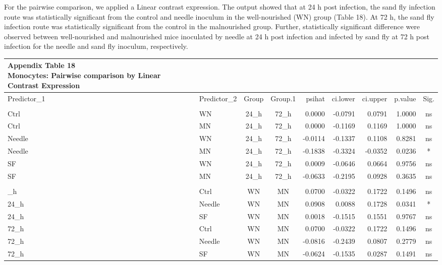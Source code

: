 \documentclass[
  12pt,
  letterpaper,
]{article}
\begin{document}
For the pairwise comparison, we applied a Linear contrast expression. The output showed that at 24 h post infection, the sand fly infection route was statistically significant from the control and needle inoculum in the well-nourished (WN) group (Table 18). At 72 h, the sand fly infection route was statistically significant from the control in the malnourished group. Further, statistically significant difference were observed between well-nourished and malnourished mice inoculated by needle at 24 h post infection and infected by sand fly at 72 h post infection for the needle and sand fly inoculum, respectively.

\begin{longtable}{llccrrrrc}
\caption*{
{\large \textbf{Appendix Table 18}} \\ 
{\small \textbf{Monocytes: Pairwise comparison by Linear Contrast Expression}}
} \\ 
\toprule
Predictor\_1 & Predictor\_2 & Group & Group.1 & psihat & ci.lower & ci.upper & p.value & Sig. \\ 
\midrule\addlinespace[2.5pt]
\multicolumn{9}{l}{Predictor: Time\_point} \\ 
\midrule\addlinespace[2.5pt]
Ctrl & WN & 24\_h & 72\_h & 0.0000 & -0.0791 & 0.0791 & 1.0000 & ns \\ 
Ctrl & MN & 24\_h & 72\_h & 0.0000 & -0.1169 & 0.1169 & 1.0000 & ns \\ 
Needle & WN & 24\_h & 72\_h & -0.0114 & -0.1337 & 0.1108 & 0.8281 & ns \\ 
Needle & MN & 24\_h & 72\_h & -0.1838 & -0.3324 & -0.0352 & 0.0236 & * \\ 
SF & WN & 24\_h & 72\_h & 0.0009 & -0.0646 & 0.0664 & 0.9756 & ns \\ 
SF & MN & 24\_h & 72\_h & -0.0633 & -0.2195 & 0.0928 & 0.3635 & ns \\ 
\midrule\addlinespace[2.5pt]
\multicolumn{9}{l}{Predictor: Diet} \\ 
\midrule\addlinespace[2.5pt]
24\_h & Ctrl & WN & MN & 0.0700 & -0.0322 & 0.1722 & 0.1496 & ns \\ 
24\_h & Needle & WN & MN & 0.0908 & 0.0088 & 0.1728 & 0.0341 & * \\ 
24\_h & SF & WN & MN & 0.0018 & -0.1515 & 0.1551 & 0.9767 & ns \\ 
72\_h & Ctrl & WN & MN & 0.0700 & -0.0322 & 0.1722 & 0.1496 & ns \\ 
72\_h & Needle & WN & MN & -0.0816 & -0.2439 & 0.0807 & 0.2779 & ns \\ 
72\_h & SF & WN & MN & -0.0624 & -0.1535 & 0.0287 & 0.1491 & ns \\ 

\end{longtable}
\end{document}
